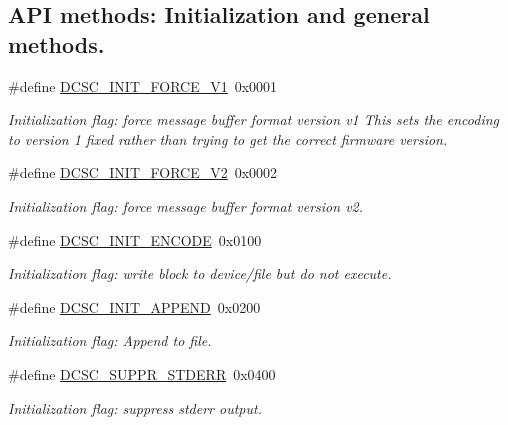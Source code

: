 \subsection*{API methods: Initialization and general methods.}
\begin{CompactItemize}
\item 
\#define \hyperlink{group__dcsc__msg__buffer__access_gce40b0def5fb1f60ecebe3d5c07dceb5}{DCSC\_\-INIT\_\-FORCE\_\-V1}~0x0001
\begin{CompactList}\small\item\em Initialization flag: force message buffer format version v1 This sets the encoding to version 1 fixed rather than trying to get the correct firmware version. \item\end{CompactList}\item 
\#define \hyperlink{group__dcsc__msg__buffer__access_g24923a207203a43bfd322e7116edf028}{DCSC\_\-INIT\_\-FORCE\_\-V2}~0x0002
\begin{CompactList}\small\item\em Initialization flag: force message buffer format version v2. \item\end{CompactList}\item 
\#define \hyperlink{group__dcsc__msg__buffer__access_g1283f28b3ca2f03f4cfef9a0f8a8ce40}{DCSC\_\-INIT\_\-ENCODE}~0x0100
\begin{CompactList}\small\item\em Initialization flag: write block to device/file but do not execute. \item\end{CompactList}\item 
\#define \hyperlink{group__dcsc__msg__buffer__access_g1bf79fbd2d8c4bcfbed37007a5e9d4b0}{DCSC\_\-INIT\_\-APPEND}~0x0200
\begin{CompactList}\small\item\em Initialization flag: Append to file. \item\end{CompactList}\item 
\#define \hyperlink{group__dcsc__msg__buffer__access_g3a969c22c4b8fc27c201023112f70bb7}{DCSC\_\-SUPPR\_\-STDERR}~0x0400
\begin{CompactList}\small\item\em Initialization flag: suppress stderr output. \item\end{CompactList}\item 

\end{CompactItemize}
